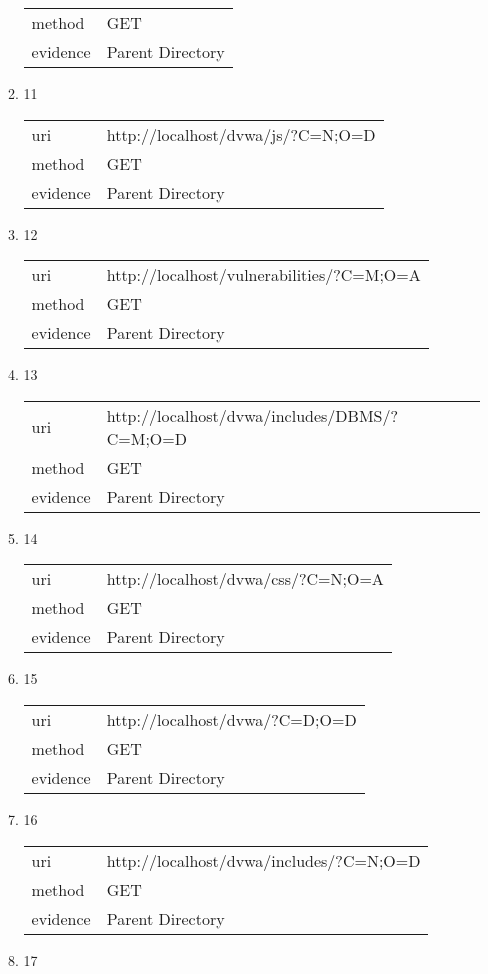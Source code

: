 \documentclass[10pt]{article}
\begin{document}
\begin{itemize}
\begin{enumerate}
\begin{tabular}{| l | p{12cm}}
method & GET \\
evidence & Parent Directory \\
\end{tabular}
\item[] 11
\begin{tabular}{| l | p{12cm}}
uri & http://localhost/dvwa/js/?C=N;O=D \\
method & GET \\
evidence & Parent Directory \\
\end{tabular}
\item[] 12
\begin{tabular}{| l | p{12cm}}
uri & http://localhost/vulnerabilities/?C=M;O=A \\
method & GET \\
evidence & Parent Directory \\
\end{tabular}
\item[] 13
\begin{tabular}{| l | p{12cm}}
uri & http://localhost/dvwa/includes/DBMS/?C=M;O=D \\
method & GET \\
evidence & Parent Directory \\
\end{tabular}
\item[] 14
\begin{tabular}{| l | p{12cm}}
uri & http://localhost/dvwa/css/?C=N;O=A \\
method & GET \\
evidence & Parent Directory \\
\end{tabular}
\item[] 15
\begin{tabular}{| l | p{12cm}}
uri & http://localhost/dvwa/?C=D;O=D \\
method & GET \\
evidence & Parent Directory \\
\end{tabular}
\item[] 16
\begin{tabular}{| l | p{12cm}}
uri & http://localhost/dvwa/includes/?C=N;O=D \\
method & GET \\
evidence & Parent Directory \\
\end{tabular}
\item[] 17
\begin{tabular}{| l | p{12cm}}

\end{tabular}
\end{enumerate}
\end{itemize}
\end{document}
